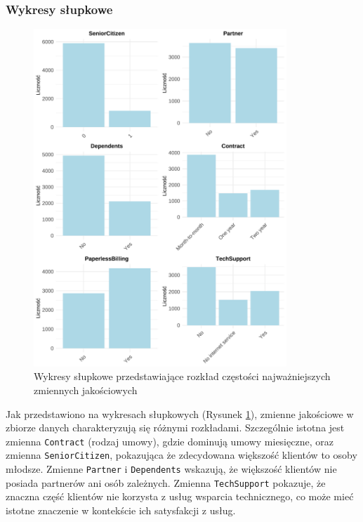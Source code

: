 \documentclass[12pt, a4paper]{article}\usepackage[]{graphicx}\usepackage[]{xcolor}
\newenvironment{knitrout}{}{} %
\begin{document}
\subsubsection{Wykresy słupkowe}
\begin{knitrout}
\color{fgcolor}\begin{figure}[H]

{\centering \includegraphics[width=0.85\textwidth]{figure/wykresy-slupkowe-1} 

}

\caption{\label{fig:wykresy-slupkowe} Wykresy słupkowe przedstawiające rozkład częstości najważniejszych zmiennych jakościowych}\label{fig:wykresy-slupkowe}
\end{figure}

\end{knitrout}

\newpage
Jak przedstawiono na wykresach słupkowych (Rysunek \ref{fig:wykresy-slupkowe}), zmienne jakościowe w zbiorze danych charakteryzują się różnymi rozkładami. Szczególnie istotna jest zmienna \texttt{Contract} (rodzaj umowy), gdzie dominują umowy miesięczne, oraz zmienna \texttt{SeniorCitizen}, pokazująca że zdecydowana większość klientów to osoby młodsze. Zmienne \texttt{Partner} i \texttt{Dependents} wskazują, że większość klientów nie posiada partnerów ani osób zależnych. Zmienna \texttt{TechSupport} pokazuje, że znaczna część klientów nie korzysta z usług wsparcia technicznego, co może mieć istotne znaczenie w kontekście ich satysfakcji z usług.
\end{document}
